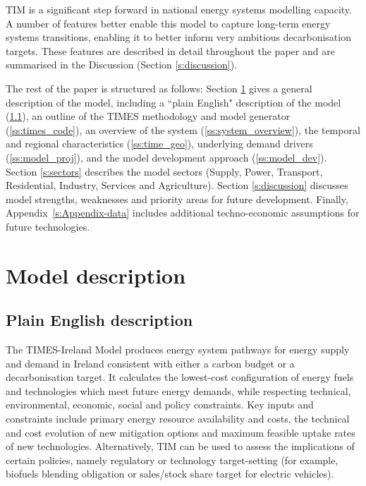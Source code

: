 \documentclass[gmd,manuscript]{copernicus}
\begin{document}
TIM is a significant step forward in national energy systems modelling capacity. A number of features better enable this model to capture long-term energy systems transitions, enabling it to better inform very ambitious decarbonisation targets. These features are described in detail throughout the paper and are summarised in the Discussion (Section \ref{s:discussion}).


The rest of the paper is structured as follows: Section \ref{S:model_desc} gives a general description of the model, including a ``plain English" description of the model (\ref{ss:model_plain}), an outline of the TIMES methodology and model generator (\ref{ss:times_code}), an overview of the system (\ref{ss:system_overview}), the temporal and regional characteristics (\ref{ss:time_geo}), underlying demand drivers (\ref{ss:model_proj}), and the model development approach (\ref{ss:model_dev}). Section \ref{s:sectors} describes the model sectors (Supply, Power, Transport, Residential, Industry, Services and Agriculture). Section \ref{s:discussion} discusses model strengths, weaknesses and priority areas for future development. Finally, Appendix~\ref{s:Appendix-data} includes additional techno-economic assumptions for future technologies. 

\section{Model description}
\label{S:model_desc}

\subsection{Plain English description}
\label{ss:model_plain}
The TIMES-Ireland Model produces energy system pathways for energy supply and demand in Ireland consistent with either a carbon budget or a decarbonisation target. It calculates the lowest-cost configuration of energy fuels and technologies which meet future energy demands, while respecting technical, environmental, economic, social and policy constraints. Key inputs and constraints include primary energy resource availability and costs, the technical and cost evolution of new mitigation options and maximum feasible uptake rates of new technologies. Alternatively, TIM can be used to assess the implications of certain policies, namely regulatory or technology target-setting (for example, biofuels blending obligation or sales/stock share target for electric vehicles).
\end{document}
